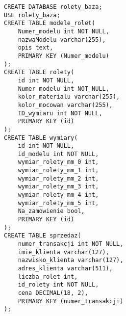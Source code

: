 \documentclass[a4paper,12pt]{article}
\begin{document}
\begin{lstlisting}
CREATE DATABASE rolety_baza;
USE rolety_baza;
CREATE TABLE modele_rolet(
    Numer_modelu int NOT NULL,
    nazwaModelu varchar(255),
    opis text,
    PRIMARY KEY (Numer_modelu)
);
CREATE TABLE rolety(
    id int NOT NULL,
    Numer_modelu int NOT NULL,
    kolor_materialu varchar(255),
    kolor_mocowan varchar(255),
    ID_wymiaru int NOT NULL,
    PRIMARY KEY (id)
);
CREATE TABLE wymiary(
    id int NOT NULL,
    id_modelu int NOT NULL,
    wymiar_rolety_mm_0 int,
    wymiar_rolety_mm_1 int,
    wymiar_rolety_mm_2 int,
    wymiar_rolety_mm_3 int,
    wymiar_rolety_mm_4 int,
    wymiar_rolety_mm_5 int,
    Na_zamowienie bool,
    PRIMARY KEY (id)
);
CREATE TABLE sprzedaz(
    numer_transakcji int NOT NULL,
    imie_klienta varchar(127),
    nazwisko_klienta varchar(127),
    adres_klienta varchar(511),
    liczba_rolet int,
    id_rolety int NOT NULL,
    cena DECIMAL(18, 2),
    PRIMARY KEY (numer_transakcji)
);
\end{lstlisting}
\end{document}
